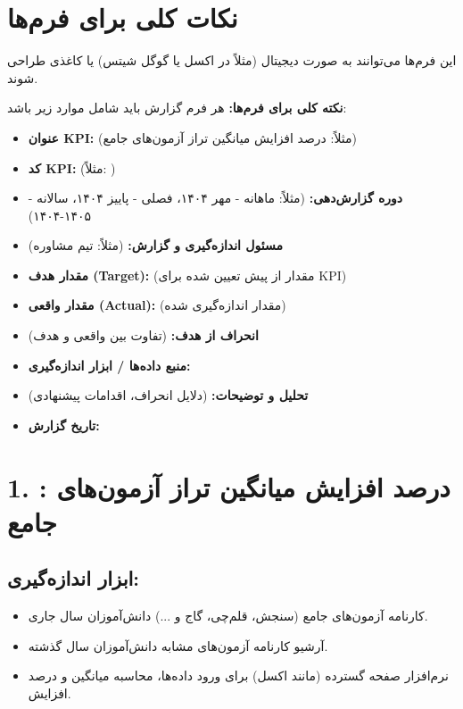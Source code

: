 \documentclass[11pt]{article}
\begin{document}
\section*{نکات کلی برای فرم‌ها}

این فرم‌ها می‌توانند به صورت دیجیتال (مثلاً در اکسل یا گوگل شیتس) یا کاغذی طراحی شوند.

\textbf{نکته کلی برای فرم‌ها:} هر فرم گزارش باید شامل موارد زیر باشد:
\begin{itemize}
    \item \textbf{عنوان KPI:} (مثلاً: درصد افزایش میانگین تراز آزمون‌های جامع)
    \item \textbf{کد KPI:} (مثلاً: )
    \item \textbf{دوره گزارش‌دهی:} (مثلاً: ماهانه - مهر ۱۴۰۴، فصلی - پاییز ۱۴۰۴، سالانه - ۱۴۰۵-۱۴۰۴)
    \item \textbf{مسئول اندازه‌گیری و گزارش:} (مثلاً: تیم مشاوره)
    \item \textbf{مقدار هدف (Target):} (مقدار از پیش تعیین شده برای KPI)
    \item \textbf{مقدار واقعی (Actual):} (مقدار اندازه‌گیری شده)
    \item \textbf{انحراف از هدف:} (تفاوت بین واقعی و هدف)
    \item \textbf{منبع داده‌ها / ابزار اندازه‌گیری:}
    \item \textbf{تحلیل و توضیحات:} (دلایل انحراف، اقدامات پیشنهادی)
    \item \textbf{تاریخ گزارش:}
\end{itemize}

\hrulefill
\bigskip

\section*{1. : درصد افزایش میانگین تراز آزمون‌های جامع}

\subsection*{ابزار اندازه‌گیری:}
\begin{itemize}
    \item کارنامه آزمون‌های جامع (سنجش، قلم‌چی، گاج و ...) دانش‌آموزان سال جاری.
    \item آرشیو کارنامه آزمون‌های مشابه دانش‌آموزان سال گذشته.
    \item نرم‌افزار صفحه گسترده (مانند اکسل) برای ورود داده‌ها، محاسبه میانگین و درصد افزایش.
\end{itemize}
\newpage
\end{document}
